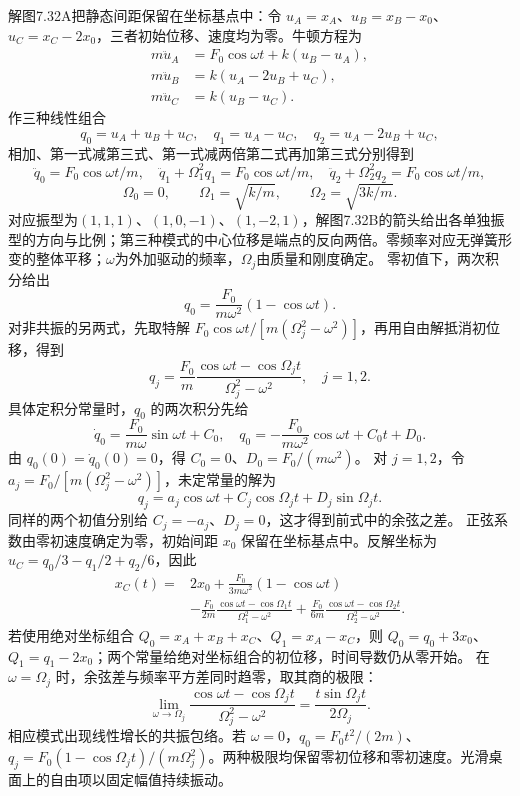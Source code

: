 \documentclass[UTF8,fontset=fandol,a4paper,11pt]{ctexart}
\begin{document}
解图7.32A把静态间距保留在坐标基点中：令 $u_A=x_A$、$u_B=x_B-x_0$、$u_C=x_C-2x_0$，三者初始位移、速度均为零。牛顿方程为
\[\begin{aligned}m\ddot u_A&=F_0\cos\omega t+k(u_B-u_A),\\
m\ddot u_B&=k(u_A-2u_B+u_C),\\
m\ddot u_C&=k(u_B-u_C).\end{aligned}\]
作三种线性组合
\[q_0=u_A+u_B+u_C,\quad q_1=u_A-u_C,\quad
q_2=u_A-2u_B+u_C,\]
相加、第一式减第三式、第一式减两倍第二式再加第三式分别得到
\[\ddot q_0=F_0\cos\omega t/m,\quad
\ddot q_1+\Omega_1^2q_1=F_0\cos\omega t/m,\quad
\ddot q_2+\Omega_2^2q_2=F_0\cos\omega t/m,\]
\[\boxed{\Omega_0=0,\qquad\Omega_1=\sqrt{k/m},\qquad
\Omega_2=\sqrt{3k/m}.}\]
对应振型为$(1,1,1)$、$(1,0,-1)$、$(1,-2,1)$，解图7.32B的箭头给出各单独振型的方向与比例；第三种模式的中心位移是端点的反向两倍。零频率对应无弹簧形变的整体平移；$\omega$为外加驱动的频率，$\Omega_j$由质量和刚度确定。
零初值下，两次积分给出
\[q_0=\frac{F_0}{m\omega^2}(1-\cos\omega t).\]
对非共振的另两式，先取特解 $F_0\cos\omega t/[m(\Omega_j^2-\omega^2)]$，再用自由解抵消初位移，得到
\[q_j=\frac{F_0}{m}\frac{\cos\omega t-\cos\Omega_jt}{\Omega_j^2-\omega^2},\quad j=1,2.\]
具体定积分常量时，$q_0$ 的两次积分先给
\[
 \dot q_0=\frac{F_0}{m\omega}\sin\omega t+C_0,\quad
 q_0=-\frac{F_0}{m\omega^2}\cos\omega t+C_0t+D_0.
\]
由 $q_0(0)=\dot q_0(0)=0$，得 $C_0=0$、$D_0=F_0/(m\omega^2)$。
对 $j=1,2$，令 $a_j=F_0/[m(\Omega_j^2-\omega^2)]$，未定常量的解为
\[
 q_j=a_j\cos\omega t+C_j\cos\Omega_jt+D_j\sin\Omega_jt.
\]
同样的两个初值分别给 $C_j=-a_j$、$D_j=0$，这才得到前式中的余弦之差。
正弦系数由零初速度确定为零，初始间距 $x_0$ 保留在坐标基点中。反解坐标为 $u_C=q_0/3-q_1/2+q_2/6$，因此
\[\begin{aligned}\boxed{x_C(t)}={}&2x_0+\frac{F_0}{3m\omega^2}(1-\cos\omega t)\\
&-\frac{F_0}{2m}\frac{\cos\omega t-\cos\Omega_1t}{\Omega_1^2-\omega^2}
+\frac{F_0}{6m}\frac{\cos\omega t-\cos\Omega_2t}{\Omega_2^2-\omega^2}.
\end{aligned}\]
若使用绝对坐标组合 $Q_0=x_A+x_B+x_C$、$Q_1=x_A-x_C$，则 $Q_0=q_0+3x_0$、$Q_1=q_1-2x_0$；两个常量给绝对坐标组合的初位移，时间导数仍从零开始。
在 $\omega=\Omega_j$ 时，余弦差与频率平方差同时趋零，取其商的极限：
\[\lim_{\omega\to\Omega_j}\frac{\cos\omega t-\cos\Omega_jt}{\Omega_j^2-\omega^2}
=\frac{t\sin\Omega_jt}{2\Omega_j}.\]
相应模式出现线性增长的共振包络。若 $\omega=0$，$q_0=F_0t^2/(2m)$、$q_j=F_0(1-\cos\Omega_jt)/(m\Omega_j^2)$。两种极限均保留零初位移和零初速度。光滑桌面上的自由项以固定幅值持续振动。
\end{document}
